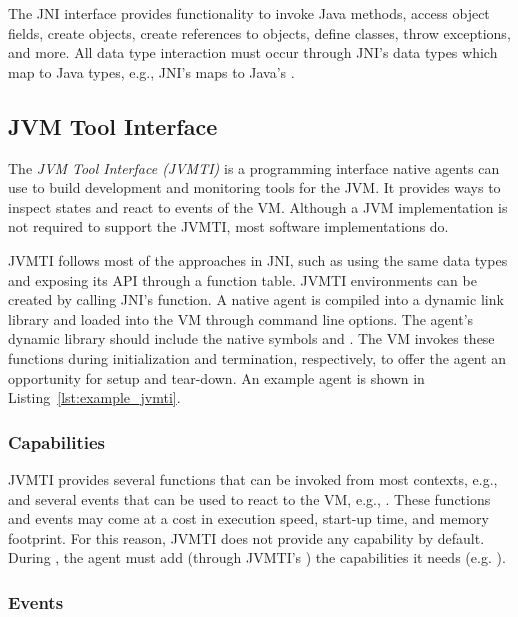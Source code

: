 The JNI interface provides functionality to invoke Java methods, access object fields, create objects, create references to objects, define classes, throw exceptions, and more. All data type interaction must occur through JNI's data types which map to Java types, e.g., JNI's  maps to Java's .

\subsection{JVM Tool Interface}

The \emph{JVM Tool Interface (JVMTI)} is a programming interface native agents can use to build development and monitoring tools for the JVM. It provides ways to inspect states and react to events of the VM. Although a JVM implementation is not required to support the JVMTI, most software implementations do.

JVMTI follows most of the approaches in JNI, such as using the same data types and exposing its API through a function table. JVMTI environments can be created by calling JNI's \href{https://docs.oracle.com/en/java/javase/11/docs/specs/jni/invocation.html#getenv}{} function. A native agent is compiled into a dynamic link library and loaded into the VM through command line options. The agent's dynamic library should include the native symbols  and . The VM invokes these functions during initialization and termination, respectively, to offer the agent an opportunity for setup and tear-down. An example agent is shown in Listing~\ref{lst:example_jvmti}.

\subsubsection*{Capabilities}

JVMTI provides several functions that can be invoked from most contexts, e.g.,  and several events that can be used to react to the VM, e.g., . These functions and events may come at a cost in execution speed, start-up time, and memory footprint. For this reason, JVMTI does not provide any capability by default. During , the agent must add (through JVMTI's ) the capabilities it needs (e.g. ).

\subsubsection*{Events}

